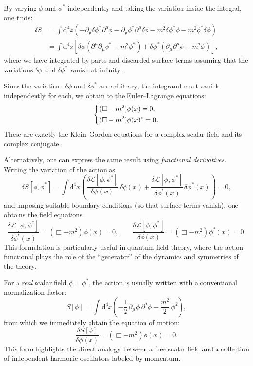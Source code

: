 By varying $\phi$ and $\phi^{\ast}$ independently and taking the variation inside the integral, one finds:
\[
    \begin{aligned}
        \delta S & = \int \mathrm{d}^4 x \left( - \partial_{\mu} \delta\phi^{\ast} \partial^{\mu} \phi- \partial_{\mu} \phi^{\ast} \partial^{\mu} \delta\phi -m^2 \delta \phi^{\ast} \phi -m^2 \phi^{\ast} \delta \phi \right) \\
                 & = \int \mathrm{d}^4 x \left[\delta \phi \left( \partial^{\mu} \partial_{\mu} \phi^{\ast} -m^2 \phi^{\ast}\right)+\delta \phi^{\ast}\left( \partial_{\mu} \partial^{\mu} \phi -m^2 \phi \right)\right],
    \end{aligned}
\]
where we have integrated by parts and discarded surface terms assuming that the variations $\delta \phi$ and $\delta \phi^{\ast}$ vanish at infinity.

Since the variations $\delta \phi$ and $\delta \phi^{\ast}$ are arbitrary, the integrand must vanish independently for each, we obtain to the Euler–Lagrange equations:
\[
    \begin{dcases}
        (\Box - m^2)\phi(x)         = 0, \\
        (\Box - m^2)\phi(x)^{\ast}  = 0.
    \end{dcases}
\]
These are exactly the Klein--Gordon equations for a complex scalar field and its complex conjugate.

Alternatively, one can express the same result using \textit{functional derivatives}.
Writing the variation of the action as
\[
    \delta S[\phi, \phi^{\ast}] =
    \int \mathrm{d}^4 x \left(
    \frac{\delta \mathcal{L}[\phi, \phi^{\ast}]}{\delta \phi(x)} \, \delta \phi(x)
    + \frac{\delta \mathcal{L}[\phi, \phi^{\ast}]}{\delta \phi^{\ast}(x)} \, \delta \phi^{\ast}(x)
    \right) = 0,
\]
and imposing suitable boundary conditions (so that surface terms vanish), one obtains the field equations
\[
    \frac{\delta \mathcal{L}[\phi, \phi^{\ast}]}{\delta \phi^{\ast}(x)} = (\Box - m^2)\phi(x) = 0,
    \qquad
    \frac{\delta \mathcal{L}[\phi, \phi^{\ast}]}{\delta \phi(x)} = (\Box - m^2)\phi^{\ast}(x) = 0.
\]
This formulation is particularly useful in quantum field theory, where the action functional plays the role of the “generator” of the dynamics and symmetries of the theory.

For a \textit{real} scalar field $\phi = \phi^{\ast}$, the action is usually written with a conventional normalization factor:
\[
    S[\phi] = \int \mathrm{d}^4 x
    \left(
    -\frac{1}{2} \, \partial_{\mu} \phi \, \partial^{\mu} \phi
    - \frac{m^2}{2} \, \phi^2
    \right),
\]
from which we immediately obtain the equation of motion:
\[
    \frac{\delta S[\phi]}{\delta \phi(x)} = (\Box - m^2)\phi(x) = 0.
\]
This form highlights the direct analogy between a free scalar field and a collection of independent harmonic oscillators labeled by momentum.

